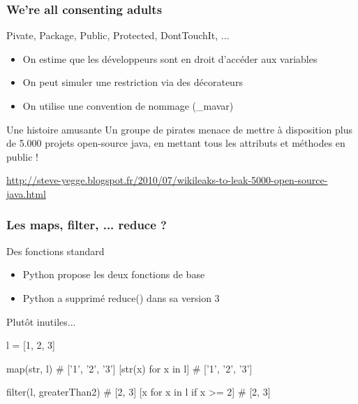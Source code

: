\documentclass{beamer}
\begin{document}
\begin{frame}
  \frametitle{We're all consenting adults}

  \begin{block}{Pivate, Package, Public, Protected, DontTouchIt, ...}
    \begin{itemize}
    \item On estime que les développeurs sont en droit d'accéder aux
      variables
    \item On peut simuler une restriction via des décorateurs
    \item On utilise une convention de nommage (\_mavar)
    \end{itemize}
  \end{block}

  \begin{block}{Une histoire amusante}
  Un groupe de pirates menace de mettre à disposition plus de 5.000
  projets open-source java, en mettant tous les attributs et méthodes
  en public !

  \url{http://steve-yegge.blogspot.fr/2010/07/wikileaks-to-leak-5000-open-source-java.html}
  \end{block}

\end{frame}

\begin{frame}[fragile]
  \frametitle{Les maps, filter, ... reduce ?}

  \begin{block}{Des fonctions standard}
    \begin{itemize}
    \item Python propose les deux fonctions de base
    \item Python a supprimé reduce() dans sa version 3
    \end{itemize}
  \end{block}

  \begin{block}{Plutôt inutiles...}
    \begin{python}
l = [1, 2, 3]

map(str, l) # ['1', '2', '3']
[str(x) for x in l] # ['1', '2', '3']

filter(l, greaterThan2) # [2, 3]
[x for x in l if x >= 2] # [2, 3]
    \end{python}
  \end{block}
\end{frame}
\end{document}
